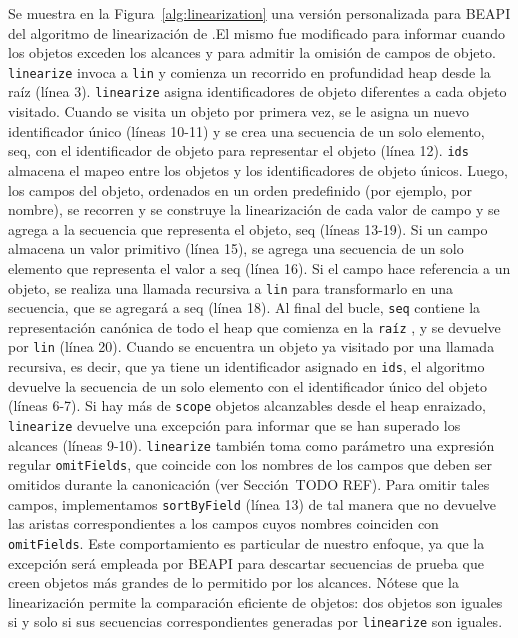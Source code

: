 Se muestra en la Figura~\ref{alg:linearization} una versión personalizada para \textsf{BEAPI} del algoritmo de linearización de  \cite{Xie04} .El mismo fue modificado para informar cuando los objetos exceden los alcances y para admitir la omisión de campos de objeto. \texttt{linearize} invoca a \texttt{lin} y  comienza un recorrido en profundidad heap desde la raíz (línea 3). \texttt{linearize} asigna identificadores de objeto diferentes a cada objeto visitado. Cuando se visita un objeto por primera vez, se le asigna un nuevo identificador único (líneas 10-11) y se crea una secuencia de un solo elemento, seq, con el identificador de objeto para representar el objeto (línea 12). \texttt{ids} almacena el mapeo entre los objetos y los identificadores de objeto únicos. Luego, los campos del objeto, ordenados en un orden predefinido (por ejemplo, por nombre), se recorren y se construye la linearización de cada valor de campo y se agrega a la secuencia que representa el objeto, seq (líneas 13-19). Si un campo almacena un valor primitivo (línea 15), se agrega una secuencia de un solo elemento que representa el valor a seq (línea 16). Si el campo hace referencia a un objeto, se realiza una llamada recursiva a \texttt{lin}  para transformarlo en una secuencia, que se agregará a seq (línea 18). Al final del bucle, \texttt{seq}  contiene la representación canónica de todo el heap que comienza en la \texttt{raíz} , y se devuelve por \texttt{lin} (línea 20). Cuando se encuentra un objeto ya visitado por una llamada recursiva, es decir, que ya tiene un identificador asignado en  \texttt{ids}, el algoritmo devuelve la secuencia de un solo elemento con el identificador único del objeto (líneas 6-7). Si hay más de \texttt{scope} objetos alcanzables desde el heap enraizado, \texttt{linearize} devuelve una excepción para informar que se han superado los alcances (líneas 9-10). \texttt{linearize} también toma como parámetro una expresión regular \texttt{omitFields}, que coincide con los nombres de los campos que deben ser omitidos durante la canonicación (ver Sección~TODO REF). Para omitir tales campos, implementamos \texttt{sortByField} (línea 13) de tal manera que no devuelve las aristas correspondientes a los campos cuyos nombres coinciden con \texttt{omitFields}. Este comportamiento es particular de nuestro enfoque, ya que la excepción será empleada por BEAPI para descartar secuencias de prueba que creen objetos más grandes de lo permitido por los alcances. Nótese que la linearización permite la comparación eficiente de objetos: dos objetos son iguales si y solo si sus secuencias correspondientes generadas por \texttt{linearize} son iguales.


